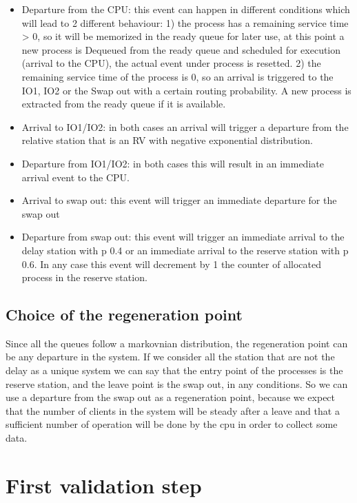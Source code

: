 \documentclass[12pt,a4paper]{article}
\begin{document}
\begin{itemize}
        \item Departure from the CPU: this event can happen in different conditions which will lead to 2 different behaviour: 1) the process has a remaining service time > 0, so it will be memorized in the ready queue for later use, at this point a new process is Dequeued from the ready queue and scheduled for execution (arrival to the CPU), the actual event under process is resetted. 2) the remaining service time of the process is 0, so an arrival is triggered to the IO1, IO2 or the Swap out with a certain routing probability. A new process is extracted from the ready queue if it is available.
        \item Arrival to IO1/IO2: in both cases an arrival will trigger a departure from the relative station that is an RV with negative exponential distribution.
        \item Departure from IO1/IO2: in both cases this will result in an immediate arrival event to the CPU. 
        \item Arrival to swap out: this event will trigger an immediate departure for the swap out 
        \item Departure from swap out: this event will trigger an immediate arrival to the delay station with p 0.4 or an immediate arrival to the reserve station with p 0.6. In any case this event will decrement by 1 the counter of allocated process in the reserve station.
    \end{itemize}

    \subsection{Choice of the regeneration point}
    Since all the queues follow a markovnian distribution, the regeneration point can be any departure in the system. If we consider all the station that are not the delay as a unique system we can say that the entry point of the processes is the reserve station, and the leave point is the swap out, in any conditions. So we can use a departure from the swap out as a regeneration point, because we expect that the number of clients in the system will be steady after a leave and that a sufficient number of operation will be done by the cpu in order to collect some data.
    \section{First validation step}
\end{document}
